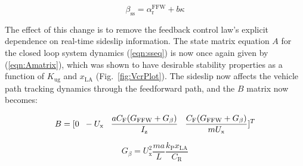 \documentclass[10pt,a4paper]{article}
\begin{document}
\begin{equation}
\beta_\mathrm{ss} = \alpha_\mathrm{r}^\mathrm{FFW} + b\kappa
\end{equation}

The effect of this change is to remove the feedback control law's explicit dependence on real-time sideslip information.
The state matrix equation $A$ for the closed loop system dynamics (\ref{eqn:sseq}) is now once again given by (\ref{eqn:Amatrix}), which was shown to have desirable stability
properties as a function of $K_\mathrm{ug}$ and $x_\mathrm{LA}$ (Fig.~\ref{fig:VcrPlot}). The sideslip now affects the vehicle path tracking dynamics through the feedforward path, and the
$B$ matrix now becomes: 

\begin{equation}
\label{eqn:newB}
\small
B =[0 \hspace{2 mm} -U_\mathrm{x} \hspace{3 mm} \frac{a C_\mathrm{F} (G_\mathrm{FFW}+G_\beta)}{I_\mathrm{z}} \hspace{3 mm}  \frac{C_\mathrm{F} (G_\mathrm{FFW}+G_\beta)}{mU_\mathrm{x}}]^T
\end {equation}

\begin{equation}
G_\beta = U_\mathrm{x}^2\frac{ma}{L}\frac{k_\mathrm{P}x_\mathrm{LA}}{C_\mathrm{R}}
\end{equation}

 
\end{document}
